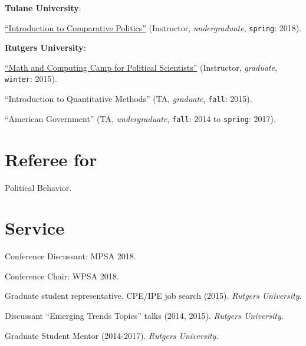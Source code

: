 \documentclass[letterpaper]{article}
\renewenvironment{itemize}{
  \begin{list}{}{
    \setlength{\leftmargin}{1.5em}
  }
}{
  \end{list}
}
\begin{document}
\begin{enumerate}

\item {\bf Tulane University}:
  
    \begin{itemize}
      \item[$\bullet$] \href{https://github.com/hbahamonde/Comparative_Politics_UGRAD/raw/master/Bahamonde_Comparative_Politics_Syllabus_UGRAD.pdf}{``Introduction to Comparative Politics''} (Instructor, \emph{undergraduate}, \texttt{spring}: 2018).
    \end{itemize}

\item {\bf Rutgers University}:

    \begin{itemize}
      \item[$\bullet$] \href{http://github.com/hbahamonde/Math-Camp/raw/master/Syllabus/Math_Camp_Syllabus.pdf/}{``Math and Computing Camp for Political Scientists''} (Instructor, \emph{graduate}, \texttt{winter}: 2015).
      
      \item[$\bullet$] ``Introduction to Quantitative Methods'' (TA, \emph{graduate}, \texttt{fall}: 2015).
      
      \item[$\bullet$] ``American Government'' (TA, \emph{undergraduate}, \texttt{fall}: 2014 to \texttt{spring}: 2017).
    \end{itemize}

\end{enumerate}


\section*{Referee for}
  \begin{itemize}
    \item[$\bullet$] Political Behavior.
  \end{itemize}

\section*{Service}

\begin{itemize}
\item[$\bullet$] Conference Discussant: MPSA 2018.
\item[$\bullet$] Conference Chair: WPSA 2018.
\item[$\bullet$] Graduate student representative. CPE/IPE job search (2015). \emph{Rutgers University}.
\item[$\bullet$] Discussant ``Emerging Trends Topics'' talks (2014, 2015). \emph{Rutgers University}.
\item[$\bullet$] Graduate Student Mentor (2014-2017). \emph{Rutgers University}.
\end{itemize}
\end{document}
